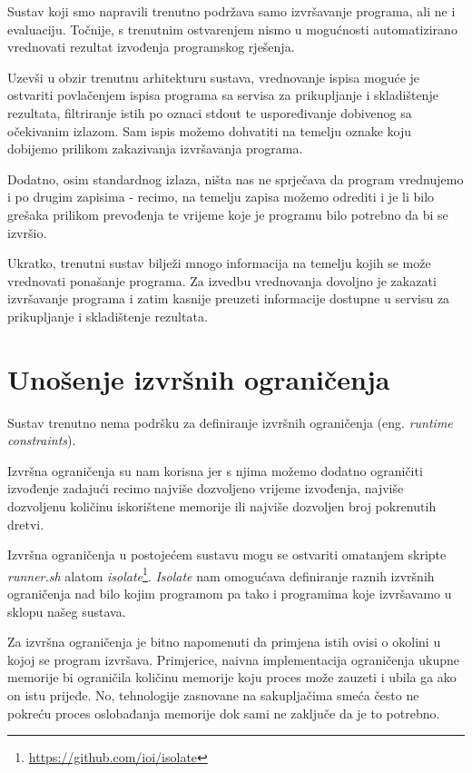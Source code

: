 \documentclass[times, utf8, zavrsni]{fer}
\begin{document}
Sustav koji smo napravili trenutno podržava samo izvršavanje programa, ali ne i evaluaciju. Točnije, s trenutnim ostvarenjem nismo u mogućnosti automatizirano vrednovati rezultat izvođenja programskog rješenja.

Uzevši u obzir trenutnu arhitekturu sustava, vrednovanje ispisa moguće je ostvariti povlačenjem ispisa programa sa servisa za prikupljanje i skladištenje rezultata, filtriranje istih po oznaci stdout te uspoređivanje dobivenog sa očekivanim izlazom. Sam ispis možemo dohvatiti na temelju oznake koju dobijemo prilikom zakazivanja izvršavanja programa.

Dodatno, osim standardnog izlaza, ništa nas ne sprječava da program vrednujemo i po drugim zapisima - recimo, na temelju zapisa možemo odrediti i je li bilo grešaka prilikom prevođenja te vrijeme koje je programu bilo potrebno da bi se izvršio.

Ukratko, trenutni sustav bilježi mnogo informacija na temelju kojih se može vrednovati ponašanje programa. Za izvedbu vrednovanja dovoljno je zakazati izvršavanje programa i zatim kasnije preuzeti informacije dostupne u servisu za prikupljanje i skladištenje rezultata.

\section{Unošenje izvršnih ograničenja}

Sustav trenutno nema podršku za definiranje izvršnih ograničenja (eng. {\textit{runtime constraints}}).

Izvršna ograničenja su nam korisna jer s njima možemo dodatno ograničiti izvođenje zadajući recimo najviše dozvoljeno vrijeme izvođenja, najviše dozvoljenu količinu iskorištene memorije ili najviše dozvoljen broj pokrenutih dretvi.

Izvršna ograničenja u postojećem sustavu mogu se ostvariti omatanjem skripte {\textit{runner.sh}} alatom {\textit{isolate}}\footnote{\url{https://github.com/ioi/isolate}}. {\textit{Isolate}} nam omogućava definiranje raznih izvršnih ograničenja nad bilo kojim programom pa tako i programima koje izvršavamo u sklopu našeg sustava.

Za izvršna ograničenja je bitno napomenuti da primjena istih ovisi o okolini u kojoj se program izvršava. Primjerice, naivna implementacija ograničenja ukupne memorije bi ograničila količinu memorije koju proces može zauzeti i ubila ga ako on istu prijeđe. No, tehnologije zasnovane na sakupljačima smeća često ne pokreću proces oslobađanja memorije dok sami ne zaključe da je to potrebno.
\end{document}

